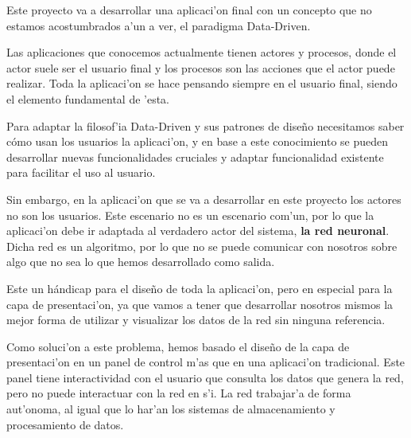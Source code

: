 


Este proyecto va a desarrollar una aplicaci'on final con un concepto que no estamos acostumbrados a'un a ver, el paradigma Data-Driven. 

Las aplicaciones que conocemos actualmente tienen actores y procesos, donde el actor suele ser el usuario final y los procesos son las acciones que el actor puede realizar. Toda la aplicaci'on se hace pensando siempre en el usuario final, siendo el elemento fundamental de 'esta. 

Para adaptar la filosof'ia Data-Driven y sus patrones de diseño necesitamos saber cómo usan los usuarios la aplicaci'on, y en base a este conocimiento se pueden desarrollar nuevas funcionalidades cruciales y adaptar funcionalidad existente para facilitar el uso al usuario.

Sin embargo, en la aplicaci'on que se va a desarrollar en este proyecto los actores no son los usuarios. Este escenario no es un escenario com'un, por lo que la aplicaci'on debe ir adaptada al verdadero actor del sistema,\textbf{ la red neuronal}. Dicha red es un algoritmo, por lo que no se puede comunicar con nosotros sobre algo que no sea lo que hemos desarrollado como salida. 

Este un hándicap para el diseño de toda la aplicaci'on, pero en especial para la capa de presentaci'on, ya que vamos a tener que desarrollar nosotros mismos la mejor forma de utilizar y visualizar los datos de la red sin ninguna referencia. 

Como soluci'on a este problema, hemos basado el diseño de la capa de presentaci'on en un panel de control m'as que en una aplicaci'on tradicional.  Este panel tiene interactividad con el usuario que consulta los datos que genera la red, pero no puede interactuar con la red en s'i. La red trabajar'a de forma aut'onoma, al igual que lo har'an los sistemas de almacenamiento y procesamiento de datos. 

















\clearpage